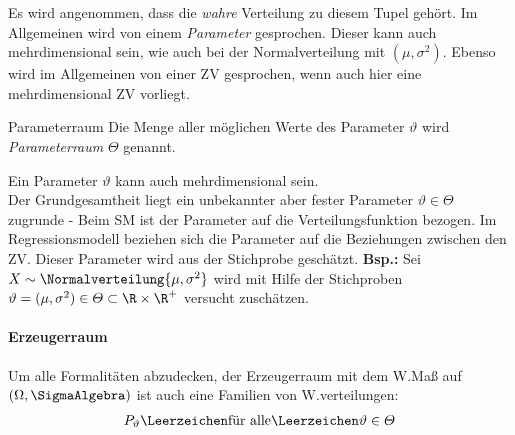 Es wird angenommen, dass die \textit{wahre} Verteilung zu diesem Tupel gehört.
Im Allgemeinen wird von einem \textit{Parameter} gesprochen. Dieser kann auch mehrdimensional sein, wie auch bei der Normalverteilung mit $(\mu, \sigma^2)$. Ebenso wird im Allgemeinen von einer \gls{ZV} gesprochen, wenn auch hier eine mehrdimensional \gls{ZV} vorliegt.\\

\begin{Lemma-Definition}{Parameterraum}
	Die Menge aller möglichen Werte des Parameter $\vartheta$ wird \textit{Parameterraum} $\varTheta$ genannt.\\
\end{Lemma-Definition}
Ein Parameter $\vartheta$ kann auch mehrdimensional sein.\\

Der Grundgesamtheit liegt ein unbekannter aber fester Parameter $\vartheta\in\varTheta$ zugrunde - Beim \gls{SM} ist der Parameter auf die Verteilungsfunktion bezogen. Im Regressionsmodell beziehen sich die Parameter auf die Beziehungen zwischen den \gls{ZV}. Dieser Parameter wird aus der Stichprobe geschätzt. \textbf{Bsp.:} Sei $X\sim\Normalverteilung{\mu, \sigma^2}$ wird mit Hilfe der Stichproben  $\vartheta = (\mu, \sigma^2)\in \varTheta \subset \R\times\R^+$ versucht zuschätzen.\\



\paragraph{Erzeugerraum}
Um alle Formalitäten abzudecken, der Erzeugerraum mit dem \gls{W.}Maß auf $(\Omega, \SigmaAlgebra)$  ist auch eine Familien von \gls{W.}verteilungen:
\begin{align*}
 P_\vartheta\Leerzeichen\text{für alle}\Leerzeichen\vartheta\in\varTheta
\end{align*}

